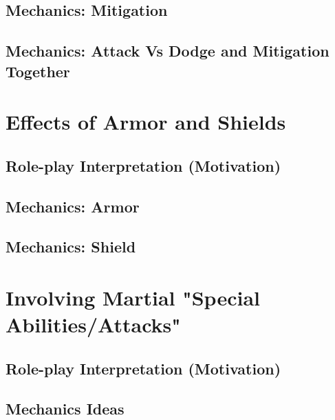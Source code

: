 \documentclass{article}
\begin{document}
        
    \subsection{Mechanics: Mitigation}\label{subsec:physMitigation}
        
        
    \subsection{Mechanics: Attack Vs Dodge and Mitigation Together}\label{subsec:atkVsMultiDefenses}
        
        
        
\section{Effects of Armor and Shields}\label{sec:armorAndShields}
    
    \subsection{Role-play Interpretation (Motivation)}
        
    \subsection{Mechanics: Armor}\label{subsec:armor}
        
        
    \subsection{Mechanics: Shield}\label{subsec:shields}
        
        

        
\section{Involving Martial "Special Abilities/Attacks"}\label{sec:SpecialAttacks}
    
    \subsection{Role-play Interpretation (Motivation)}
        
    \subsection{Mechanics Ideas}
        
        
\end{document}
